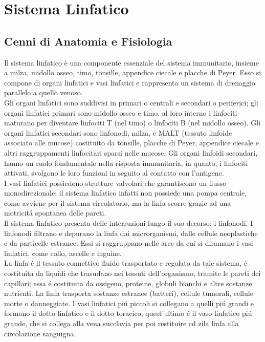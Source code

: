 \chapter{Sistema Linfatico}

\section{Cenni di Anatomia e Fisiologia}
Il sistema linfatico \`e una componente essenziale del sistema immunitario, 
insieme a milza, midollo osseo, timo, tonsille, appendice ciecale e placche di Peyer. 
Esso si compone di organi linfatici e vasi linfatici e rappresenta 
un sistema di drenaggio parallelo a quello venoso.\\

Gli organi linfatici sono suddivisi in primari o centrali 
e secondari o periferici; gli organi linfatici primari sono midollo osseo 
e timo, al loro interno i linfociti maturano per diventare linfociti T (nel timo) 
o linfociti B (nel midollo osseo). 
Gli organi linfatici secondari sono linfonodi, milza, e MALT 
(tessuto linfoide associato alle mucose) costituito da tonsille, 
placche di Peyer, appendice ciecale e altri raggruppamenti linfocitari 
sparsi nelle mucose. Gli organi linfoidi secondari, hanno un ruolo fondamentale 
nella risposta immunitaria, in quanto, i linfociti attivati, svolgono le loro funzioni 
in seguito al contatto con l'antigene.\\

I vasi linfatici possiedono strutture valvolari che garantiscono un flusso monodirezionale; 
il sistema linfatico infatti non possiede una pompa centrale, 
come avviene per il sistema circolatorio, ma la linfa scorre grazie ad una motricit\'a spontanea delle pareti.\\

Il sistema linfatico presenta delle interruzioni lungo il suo decorso: i linfonodi. 
I linfonodi filtrano e depurano la linfa dai microrganismi, dalle cellule neoplastiche e 
da particelle estranee. Essi si raggruppano nelle aree da cui si diramano i vasi linfatici, 
come collo, ascelle e inguine.\\
La linfa \'e il tessuto connettivo fluido trasportato e regolato da tale sistema, \'e costituita 
da liquidi che trasudano nei tessuti dell'organismo, tramite le pareti dei capillari; essa \'e costituita 
da ossigeno, proteine, globuli bianchi e altre sostanze nutrienti. 
La linfa trasporta sostanze estranee (batteri), cellule tumorali, cellule morte o danneggiate. 
I vasi linfatici pi\'u piccoli si collegano a quelli pi\'u grandi e formano il dotto linfatico e il dotto 
toracico, quest'ultimo \'e il vaso linfatico pi\'u grande, che si collega alla vena succlavia per poi restituire 
cd zila linfa alla circolazione sanguigna. \\

